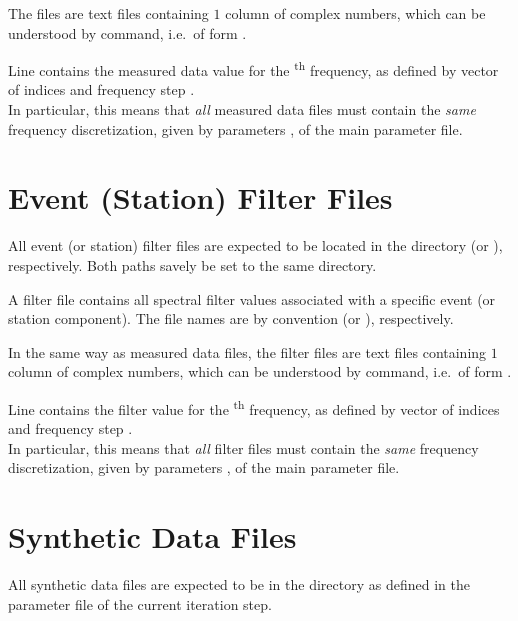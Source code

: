 The files are text files containing $1$ column of  complex numbers, 
which can be understood by   command, i.e.\ of form  .

Line  contains the measured data value for the \textsuperscript{th} frequency, as defined by vector
of indices  and frequency step . \\
In particular, this means that \emph{all} measured data files must contain the \emph{same} frequency discretization, given
by parameters ,  of the main 
parameter file.
%
\section{Event (Station) Filter Files} \label{files,sec:filters}
%
All event (or station) filter files are expected to be located in the directory  
(or ), respectively. Both paths savely be set to the same directory.

A filter file contains all spectral filter values associated with a specific event (or station component). 
The file names are by convention  (or ), respectively.

In the same way as measured data files, the filter files are text files containing $1$ column of 
 complex numbers, 
which can be understood by   command, i.e.\ of form  .

Line  contains the filter value for the \textsuperscript{th} frequency, as defined by vector
of indices  and frequency step . \\
In particular, this means that \emph{all} filter files must contain the \emph{same} frequency discretization, given
by parameters ,  of the main 
parameter file.
%
\section{Synthetic Data Files} \label{files,sec:synth_data} 
%
All synthetic data files are expected to be in the directory  as defined 
in the parameter file of the current iteration step.

